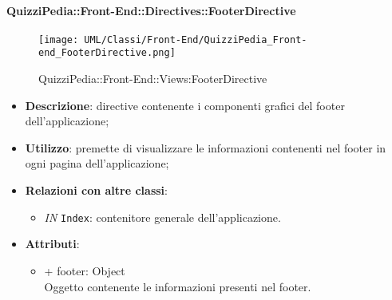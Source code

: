 \paragraph{QuizziPedia::Front-End::Directives::FooterDirective}
\begin{figure} [ht]
	\centering
	\texttt{[image: UML/Classi/Front-End/QuizziPedia\_Front-end\_FooterDirective.png]}
	\caption{QuizziPedia::Front-End::Views:FooterDirective}
\end{figure} \FloatBarrier
\begin{itemize}
	\item \textbf{Descrizione}: directive contenente i componenti grafici del footer dell'applicazione;
	\item \textbf{Utilizzo}: premette di visualizzare le informazioni contenenti nel footer in ogni pagina dell'applicazione;
	\item \textbf{Relazioni con altre classi}:
	\begin{itemize}
		\item \textit{IN} \texttt{Index}: contenitore generale dell'applicazione.
	\end{itemize}
	\item \textbf{Attributi}:
	\begin{itemize}
		\item {+ footer: Object} \\ Oggetto contenente le informazioni presenti nel footer.
	\end{itemize}
\end{itemize}